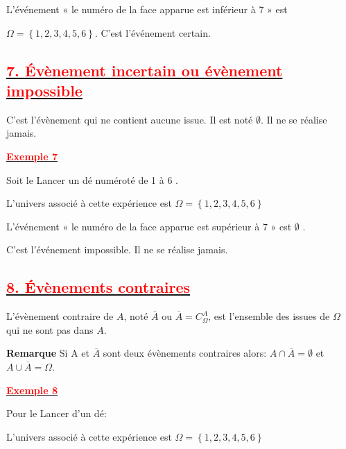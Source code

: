 \documentclass[12pt,a4paper]{article}
\begin{document}
L’événement « le numéro de la face apparue est inférieur à 7 » est 

$\Omega = \left\lbrace 1, 2, 3, 4, 5, 6\right\rbrace $. C’est l’événement certain.

\subsection*{\underline{\textbf{\textcolor{red}{7. Évènement incertain ou évènement impossible}}}}
C'est l'évènement qui ne contient aucune issue. Il est noté $\emptyset$. Il ne se réalise jamais.

\underline{\textbf{\textcolor{red}{Exemple 7}}}

Soit le Lancer un dé numéroté de 1 à 6 .

L’univers associé à cette expérience est $\Omega = \left\lbrace 1, 2, 3, 4, 5, 6 \right\rbrace $

L’événement « le numéro de la face apparue est supérieur à 7 » est $\emptyset$ .

C’est l’événement impossible. Il ne se réalise jamais.

\subsection*{\underline{\textbf{\textcolor{red}{8. Évènements contraires}}}}

L’évènement contraire de $A$, noté $\overline{A}$ ou $\overline{A}=C^{A}_{\Omega}$, est l'ensemble des issues de $\Omega$ qui ne sont pas dans $A$.


\textbf{Remarque}
Si A et $\overline{A}$ sont deux évènements contraires alors:
$A \cap \overline{A} = \emptyset$ et $A \cup \overline{A} = \Omega$.

\underline{\textbf{\textcolor{red}{Exemple 8}}}

Pour le Lancer d’un dé:

L’univers associé à cette expérience est $\Omega = \left\lbrace 1, 2, 3, 4, 5, 6 \right\rbrace $
\end{document}
